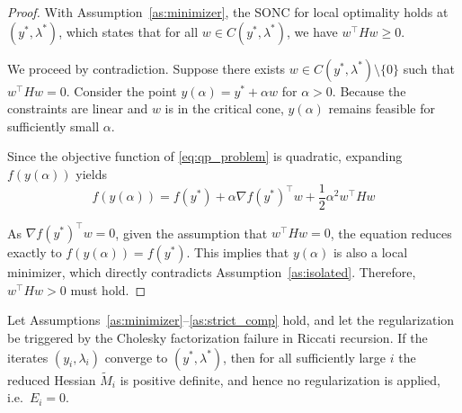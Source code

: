 \documentclass[class=scrbook, crop=false]{standalone}
\begin{document}
\begin{proof}
    With Assumption~\ref{as:minimizer}, the \gls{SONC} for local optimality holds at $(y^*,\lambda^*)$, which states that for all $w \in C(y^*,\lambda^*)$, we have $w^\top H w \ge 0$.

    We proceed by contradiction. Suppose there exists $w \in C(y^*,\lambda^*) \setminus \{0\}$ such that $w^\top H w = 0$. 
    Consider the point $y(\alpha) = y^* + \alpha w$ for $\alpha > 0$. Because the constraints are linear and $w$ is in the critical cone, 
    $y(\alpha)$ remains feasible for sufficiently small $\alpha$.

    Since the objective function of \eqref{eq:qp_problem} is quadratic, expanding $f(y(\alpha))$ yields
    \begin{equation*}
        f(y(\alpha)) = f(y^*) + \alpha \nabla f(y^*)^\top w + \frac{1}{2} \alpha^2 w^\top H w
    \end{equation*}

    As $\nabla f(y^*)^\top w = 0$, given the assumption that $w^\top H w = 0$, the equation reduces exactly to $f(y(\alpha)) = f(y^*)$. 
    This implies that $y(\alpha)$ is also a local minimizer, which directly contradicts Assumption~\ref{as:isolated}. Therefore, $w^\top H w > 0$ must hold.
\end{proof}


\begin{proposition}
    \label{prop:vanish}
    Let Assumptions~\ref{as:minimizer}--\ref{as:strict_comp} hold,
    and let the regularization be triggered by the Cholesky factorization failure in Riccati recursion.
    If the iterates $(y_i, \lambda_i)$ converge to $(y^*, \lambda^*)$,
    then for all sufficiently large $i$ the reduced Hessian $\tilde{M}_i$ is positive definite,
    and hence no regularization is applied, i.e.\ $E_i = 0$.
\end{proposition}
\end{document}
